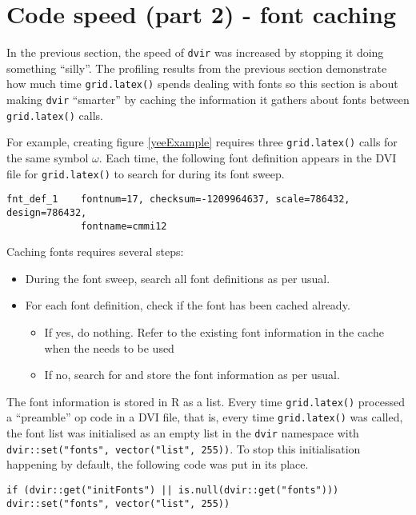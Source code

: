 \documentclass[]{article}
\begin{document}
\newpage{}

\section{Code speed (part 2) - font
caching}\label{code-speed-part-2---font-caching}

In the previous section, the speed of \texttt{dvir} was increased by
stopping it doing something ``silly''. The profiling results from the
previous section demonstrate how much time \texttt{grid.latex()} spends
dealing with fonts so this section is about making \texttt{dvir}
``smarter'' by caching the information it gathers about fonts between
\texttt{grid.latex()} calls.

For example, creating figure \ref{yeeExample} requires three
\texttt{grid.latex()} calls for the same symbol \(\omega\). Each time,
the following font definition appears in the DVI file for
\texttt{grid.latex()} to search for during its font sweep.

\begin{verbatim}
fnt_def_1    fontnum=17, checksum=-1209964637, scale=786432, design=786432,
             fontname=cmmi12
\end{verbatim}

Caching fonts requires several steps:

\begin{itemize}
  \item During the font sweep, search all font definitions as per usual.
  \item For each font definition, check if the font has been cached already.
  \begin{itemize}
    \item If yes, do nothing. Refer to the existing font information in the cache when the needs to be used
    \item If no, search for and store the font information as per usual.
  \end{itemize}
\end{itemize}

The font information is stored in R as a list. Every time
\texttt{grid.latex()} processed a ``preamble'' op code in a DVI file,
that is, every time \texttt{grid.latex()} was called, the font list was
initialised as an empty list in the \texttt{dvir} namespace with
\texttt{dvir::set("fonts",\ vector("list",\ 255))}. To stop this
initialisation happening by default, the following code was put in its
place.

\begin{verbatim}
if (dvir::get("initFonts") || is.null(dvir::get("fonts"))) dvir::set("fonts", vector("list", 255))
\end{verbatim}
\end{document}
